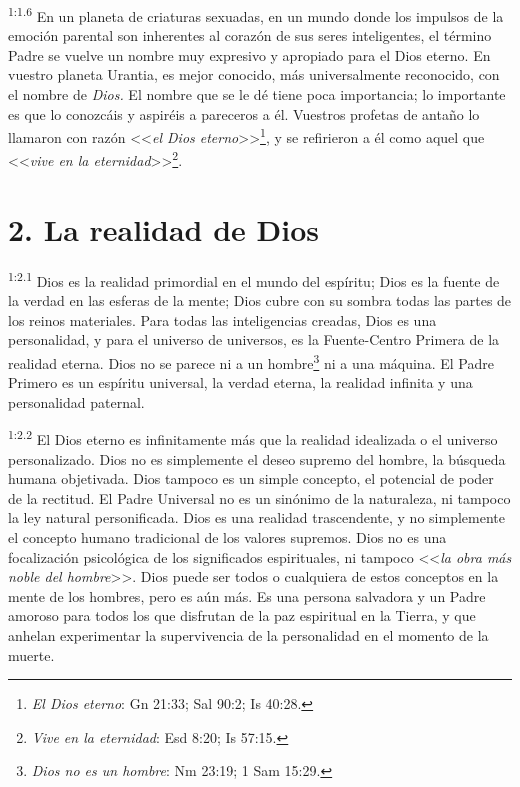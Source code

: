 \par
\textsuperscript{1:1.6} En un planeta de criaturas sexuadas, en un mundo donde los impulsos de la emoción parental son inherentes al corazón de sus seres inteligentes, el término Padre se vuelve un nombre muy expresivo y apropiado para el Dios eterno. En vuestro planeta Urantia, es mejor conocido, más universalmente reconocido, con el nombre de \textit{Dios.} El nombre que se le dé tiene poca importancia; lo importante es que lo conozcáis y aspiréis a pareceros a él. Vuestros profetas de antaño lo llamaron con razón <<\textit{el Dios eterno}>>\footnote{\textit{El Dios eterno}: Gn 21:33; Sal 90:2; Is 40:28.}, y se refirieron a él como aquel que <<\textit{vive en la eternidad}>>\footnote{\textit{Vive en la eternidad}: Esd 8:20; Is 57:15.}.

\section*{2. La realidad de Dios}
\par
\textsuperscript{1:2.1} Dios es la realidad primordial en el mundo del espíritu; Dios es la fuente de la verdad en las esferas de la mente; Dios cubre con su sombra todas las partes de los reinos materiales. Para todas las inteligencias creadas, Dios es una personalidad, y para el universo de universos, es la Fuente-Centro Primera de la realidad eterna. Dios no se parece ni a un hombre\footnote{\textit{Dios no es un hombre}: Nm 23:19; 1 Sam 15:29.} ni a una máquina. El Padre Primero es un espíritu universal, la verdad eterna, la realidad infinita y una personalidad paternal.

\par
\textsuperscript{1:2.2} El Dios eterno es infinitamente más que la realidad idealizada o el universo personalizado. Dios no es simplemente el deseo supremo del hombre, la búsqueda humana objetivada. Dios tampoco es un simple concepto, el potencial de poder de la rectitud. El Padre Universal no es un sinónimo de la naturaleza, ni tampoco la ley natural personificada. Dios es una realidad trascendente, y no simplemente el concepto humano tradicional de los valores supremos. Dios no es una focalización psicológica de los significados espirituales, ni tampoco <<\textit{la obra más noble del hombre}>>. Dios puede ser todos o cualquiera de estos conceptos en la mente de los hombres, pero es aún más. Es una persona salvadora y un Padre amoroso para todos los que disfrutan de la paz espiritual en la Tierra, y que anhelan experimentar la supervivencia de la personalidad en el momento de la muerte.

